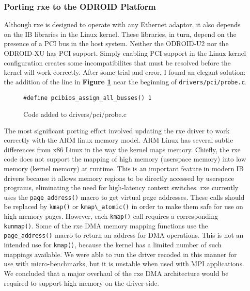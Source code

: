 \documentclass[a4paper]{article}
\begin{document}
\subsubsection{\textbf{Porting rxe to the ODROID Platform}}


Although rxe is designed to operate with any Ethernet adaptor, it also depends
on the IB libraries in the Linux kernel. These libraries, in turn, depend on the
presence of a PCI bus in the host system. Neither the ODROID-U2 nor the
ODROID-XU has PCI support. Simply enabling PCI support in the Linux kernel
configuration creates some incompatibilites that must be resolved before the
kernel will work correctly. After some trial and error, I found an elegant
solution: the addition of the line in \textbf{Figure \ref{pci_code}} near the
beginning of \verb;drivers/pci/probe.c;.

\begin{figure}[h]
\begin{verbatim}
#define pcibios_assign_all_busses() 1
\end{verbatim}
\caption{Code added to drivers/pci/probe.c}
\label{pci_code}
\end{figure}

The most significant porting effort involved updating the rxe driver to work
correctly with the ARM linux memory model. ARM Linux has several subtle
differences from x86 Linux in the way the kernel maps memory. Chiefly, the rxe
code does not support the mapping of high memory (userspace memory) into low
memory (kernel memory) at runtime. This is an important feature in modern IB
drivers because it allows memory regions to be directly accessed by userspace
programs, eliminating the need for high-latency context switches. rxe currently
uses the \verb;page_address(); macro to get virtual page addresses. These calls
should be replaced by \verb;kmap(); or \verb;kmap\_atomic(); in order to make
them safe for use on high memory pages. However, each \verb;kmap(); call
requires a corresponding \verb;kunmap();. Some of the rxe DMA memory mapping
functions use the \verb;page_address(); macro to return an address for DMA
operations. This is not an intended use for \verb;kmap();, because the kernel
has a limited number of such mappings available. We were able to run the driver
recoded in this manner for use with micro-benchmarks, but it is unstable when
used with MPI applications. We concluded that a major overhaul of the rxe DMA
architecture would be required to support high memory on the driver side.
\end{document}
